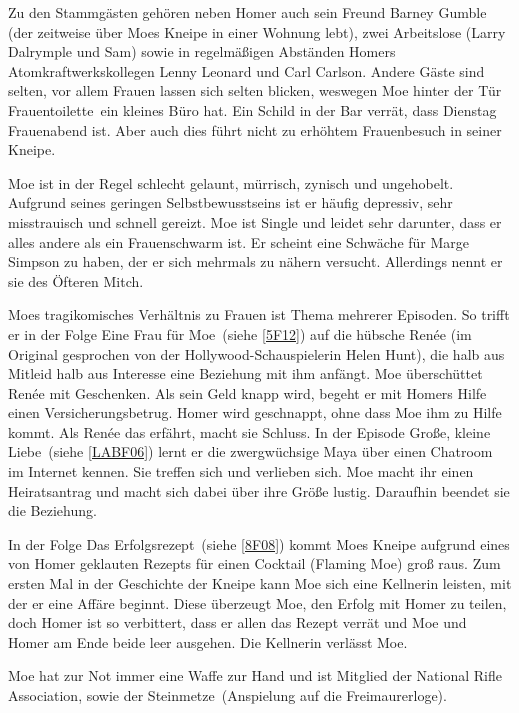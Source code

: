 {Zu den Stammgästen gehören neben Homer auch sein Freund Barney Gumble (der zeitweise über Moes Kneipe in einer Wohnung lebt), zwei Arbeitslose (Larry Dalrymple und Sam) sowie in regelmäßigen Abständen Homers Atomkraftwerkskollegen Lenny Leonard und Carl Carlson. Andere Gäste sind selten, vor allem Frauen lassen sich selten blicken, weswegen Moe hinter der Tür \glqq Frauentoilette\grqq\ ein kleines Büro hat. Ein Schild in der Bar verrät, dass Dienstag Frauenabend ist. Aber auch dies führt nicht zu erhöhtem Frauenbesuch in seiner Kneipe.

Moe ist in der Regel schlecht gelaunt, mürrisch, zynisch und ungehobelt. Aufgrund seines geringen Selbstbewusstseins ist er häufig depressiv, sehr misstrauisch und schnell gereizt. Moe ist Single und leidet sehr darunter, dass er alles andere als ein Frauenschwarm ist. Er scheint eine Schwäche für Marge Simpson zu haben, der er sich mehrmals zu nähern versucht. Allerdings nennt er sie des Öfteren Mitch.

Moes tragikomisches Verhältnis zu Frauen ist Thema mehrerer Episoden. So trifft er in der Folge \glqq Eine Frau für Moe\grqq\ (siehe \ref{5F12}) auf die hübsche Renée (im Original gesprochen von der Hollywood-Schauspielerin Helen Hunt), die halb aus Mitleid halb aus Interesse eine Beziehung mit ihm anfängt. Moe überschüttet Renée mit Geschenken. Als sein Geld knapp wird, begeht er mit Homers Hilfe einen Versicherungsbetrug. Homer wird geschnappt, ohne dass Moe ihm zu Hilfe kommt. Als Renée das erfährt, macht sie Schluss. In der Episode \glqq Große, kleine Liebe\grqq\ (siehe \ref{LABF06}) lernt er die zwergwüchsige Maya über einen Chatroom im Internet kennen. Sie treffen sich und verlieben sich. Moe macht ihr einen Heiratsantrag und macht sich dabei über ihre Größe lustig. Daraufhin beendet sie die Beziehung.

In der Folge \glqq Das Erfolgsrezept\grqq\ (siehe \ref{8F08}) kommt Moes Kneipe aufgrund eines von Homer geklauten Rezepts für einen Cocktail (\glqq Flaming Moe\grqq ) groß raus. Zum ersten Mal in der Geschichte der Kneipe kann Moe sich eine Kellnerin leisten, mit der er eine Affäre beginnt. Diese überzeugt Moe, den Erfolg mit Homer zu teilen, doch Homer ist so verbittert, dass er allen das Rezept verrät und Moe und Homer am Ende beide leer ausgehen. Die Kellnerin verlässt Moe.

Moe hat zur Not immer eine Waffe zur Hand und ist Mitglied der National Rifle Association, sowie der \glqq Steinmetze\grqq\ (Anspielung auf die Freimaurerloge).

}
